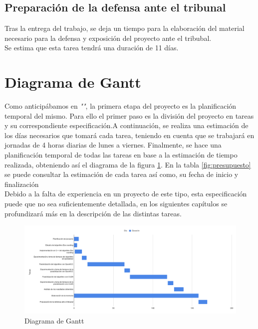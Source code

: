 \subsection{Preparación de la defensa ante el tribunal}
Tras la entrega del trabajo, se deja un tiempo para la elaboración del material necesario para la defensa y exposición del proyecto ante el tribubal.\\

Se estima que esta tarea tendrá una duración de 11 días.


\section{Diagrama de Gantt}
Como anticipábamos en \textit{""}, la primera etapa del proyecto es la planificación temporal del mismo. Para ello el primer paso es la división del proyecto en tareas y su correspondiente especificación.A continuación, se realiza una estimación de los días necesarios que tomará cada tarea, teniendo en cuenta que se trabajará en jornadas de 4 horas diarias de lunes a viernes. Finalmente, se hace una planificación temporal de todas las tareas en base a la estimación de tiempo realizada, obteniendo así el diagrama de la figura \ref{fig:Gantt}. En la tabla \ref{fig:presupuesto} se puede consultar la estimación de cada tarea así como, su fecha de inicio y finalización\\ Debido a la falta de experiencia en un proyecto de este tipo, esta especificación puede que no sea suficientemente detallada, en los siguientes capítulos se profundizará más en la descripción de las distintas tareas.\\

\begin{figure}[b]
    \centering
    \includegraphics[width=\textwidth]{img/Diagrama de Gantt.png}
    \caption{Diagrama de Gantt}
    \label{fig:Gantt}
\end{figure}

